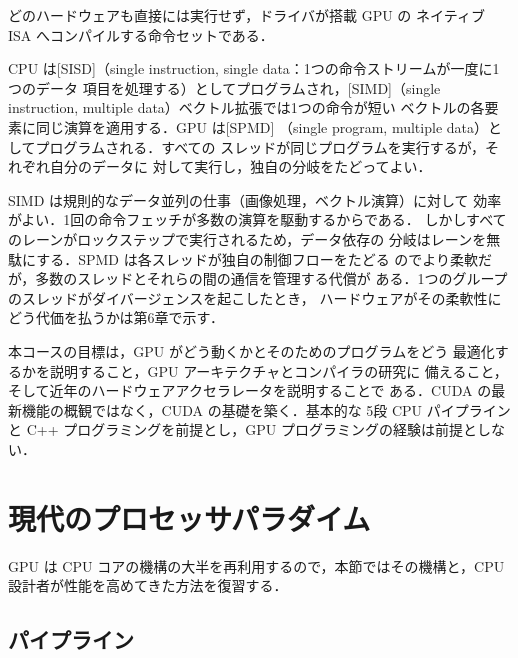 \documentclass[../main.tex]{subfiles}
\begin{document}
\begin{description}
    どのハードウェアも直接には実行せず，ドライバが搭載 GPU の
    ネイティブ ISA へコンパイルする命令セットである．
  \item[プログラミングモデル] CPU は[SISD]（single
    instruction, single data：1つの命令ストリームが一度に1つのデータ
    項目を処理する）としてプログラムされ，[SIMD]（single
    instruction, multiple data）ベクトル拡張では1つの命令が短い
    ベクトルの各要素に同じ演算を適用する．GPU は[SPMD]
    （single program, multiple data）としてプログラムされる．すべての
    スレッドが同じプログラムを実行するが，それぞれ自分のデータに
    対して実行し，独自の分岐をたどってよい．
\end{description}

SIMD は規則的なデータ並列の仕事（画像処理，ベクトル演算）に対して
効率がよい．1回の命令フェッチが多数の演算を駆動するからである．
しかしすべてのレーンがロックステップで実行されるため，データ依存の
分岐はレーンを無駄にする．SPMD は各スレッドが独自の制御フローをたどる
のでより柔軟だが，多数のスレッドとそれらの間の通信を管理する代償が
ある．1つのグループのスレッドがダイバージェンスを起こしたとき，
ハードウェアがその柔軟性にどう代価を払うかは第6章で示す．

\begin{note}
  本コースの目標は，GPU がどう動くかとそのためのプログラムをどう
  最適化するかを説明すること，GPU アーキテクチャとコンパイラの研究に
  備えること，そして近年のハードウェアアクセラレータを説明することで
  ある．CUDA の最新機能の概観ではなく，CUDA の基礎を築く．基本的な
  5段 CPU パイプラインと C++ プログラミングを前提とし，GPU
  プログラミングの経験は前提としない．
\end{note}

\section{現代のプロセッサパラダイム}
\label{sec:l01-processor-paradigms}

GPU は CPU コアの機構の大半を再利用するので，本節ではその機構と，CPU
設計者が性能を高めてきた方法を復習する．

\subsection{パイプライン}
\end{document}
